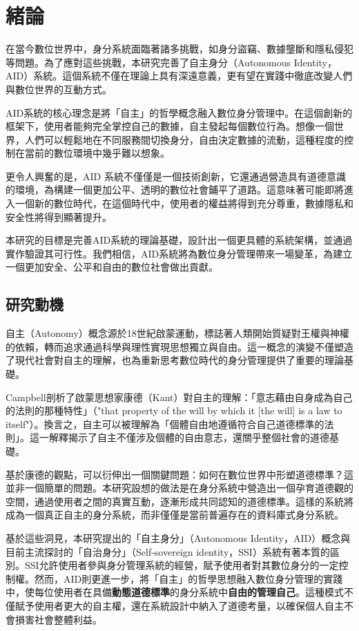 
\chapter{緒論}
在當今數位世界中，身分系統面臨著諸多挑戰，如身分盜竊、數據壟斷和隱私侵犯等問題。為了應對這些挑戰，本研究完善了自主身分（Autonomous Identity，AID）系統。這個系統不僅在理論上具有深遠意義，更有望在實踐中徹底改變人們與數位世界的互動方式。

AID系統的核心理念是將「自主」的哲學概念融入數位身分管理中。在這個創新的框架下，使用者能夠完全掌控自己的數據，自主發起每個數位行為。想像一個世界，人們可以輕鬆地在不同服務間切換身分，自由決定數據的流動，這種程度的控制在當前的數位環境中幾乎難以想象。

更令人興奮的是，AID 系統不僅僅是一個技術創新，它還通過營造具有道德意識的環境，為構建一個更加公平、透明的數位社會鋪平了道路。這意味著可能即將進入一個新的數位時代，在這個時代中，使用者的權益將得到充分尊重，數據隱私和安全性將得到顯著提升。

本研究的目標是完善AID系統的理論基礎，設計出一個更具體的系統架構，並通過實作驗證其可行性。我們相信，AID系統將為數位身分管理帶來一場變革，為建立一個更加安全、公平和自由的數位社會做出貢獻。
\section{研究動機}
自主（Autonomy）概念源於18世紀啟蒙運動，標誌著人類開始質疑對王權與神權的依賴，轉而追求通過科學與理性實現思想獨立與自由。這一概念的演變不僅塑造了現代社會對自主的理解，也為重新思考數位時代的身分管理提供了重要的理論基礎。

Campbell\cite{CAMPBELL2017381}剖析了啟蒙思想家康德（Kant）對自主的理解：「意志藉由自身成為自己的法則的那種特性」（"that property of the will by which it [the will] is a law to itself"）。換言之，自主可以被理解為「個體自由地遵循符合自己道德標準的法則」。這一解釋揭示了自主不僅涉及個體的自由意志，還關乎整個社會的道德基礎。

基於康德的觀點，可以衍伸出一個關鍵問題：如何在數位世界中形塑道德標準？這並非一個簡單的問題。本研究設想的做法是在身分系統中營造出一個孕育道德觀的空間，通過使用者之間的真實互動，逐漸形成共同認知的道德標準。這樣的系統將成為一個真正自主的身分系統，而非僅僅是當前普遍存在的資料庫式身分系統。

基於這些洞見，本研究提出的「自主身分」（Autonomous Identity，AID）概念與目前主流探討的「自治身分」（Self-sovereign identity，SSI）系統有著本質的區別。SSI允許使用者參與身分管理系統的經營，賦予使用者對其數位身分的一定控制權。然而，AID則更進一步，將「自主」的哲學思想融入數位身分管理的實踐中，使每位使用者在具備\textbf{動態道德標準}的身分系統中\textbf{自由的管理自己}。這種模式不僅賦予使用者更大的自主權，還在系統設計中納入了道德考量，以確保個人自主不會損害社會整體利益。
